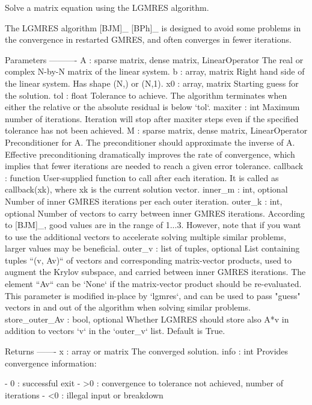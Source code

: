 \begin{DoxyVerb}Solve a matrix equation using the LGMRES algorithm.

The LGMRES algorithm [BJM]_ [BPh]_ is designed to avoid some problems
in the convergence in restarted GMRES, and often converges in fewer
iterations.

Parameters
----------
A : {sparse matrix, dense matrix, LinearOperator}
    The real or complex N-by-N matrix of the linear system.
b : {array, matrix}
    Right hand side of the linear system. Has shape (N,) or (N,1).
x0  : {array, matrix}
    Starting guess for the solution.
tol : float
    Tolerance to achieve. The algorithm terminates when either the relative
    or the absolute residual is below `tol`.
maxiter : int
    Maximum number of iterations.  Iteration will stop after maxiter
    steps even if the specified tolerance has not been achieved.
M : {sparse matrix, dense matrix, LinearOperator}
    Preconditioner for A.  The preconditioner should approximate the
    inverse of A.  Effective preconditioning dramatically improves the
    rate of convergence, which implies that fewer iterations are needed
    to reach a given error tolerance.
callback : function
    User-supplied function to call after each iteration.  It is called
    as callback(xk), where xk is the current solution vector.
inner_m : int, optional
    Number of inner GMRES iterations per each outer iteration.
outer_k : int, optional
    Number of vectors to carry between inner GMRES iterations.
    According to [BJM]_, good values are in the range of 1...3.
    However, note that if you want to use the additional vectors to
    accelerate solving multiple similar problems, larger values may
    be beneficial.
outer_v : list of tuples, optional
    List containing tuples ``(v, Av)`` of vectors and corresponding
    matrix-vector products, used to augment the Krylov subspace, and
    carried between inner GMRES iterations. The element ``Av`` can
    be `None` if the matrix-vector product should be re-evaluated.
    This parameter is modified in-place by `lgmres`, and can be used
    to pass "guess" vectors in and out of the algorithm when solving
    similar problems.
store_outer_Av : bool, optional
    Whether LGMRES should store also A*v in addition to vectors `v`
    in the `outer_v` list. Default is True.

Returns
-------
x : array or matrix
    The converged solution.
info : int
    Provides convergence information:

        - 0  : successful exit
        - >0 : convergence to tolerance not achieved, number of iterations
        - <0 : illegal input or breakdown


\end{DoxyVerb}
